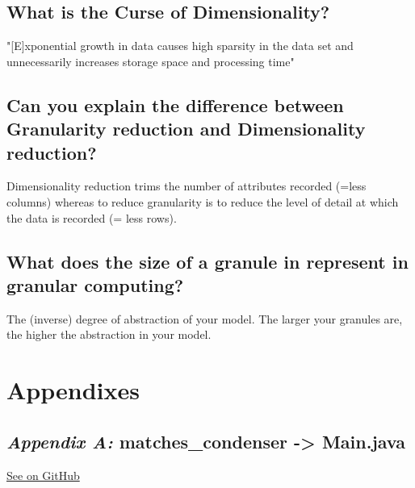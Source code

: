 \subsection{What is the Curse of Dimensionality?}

"[E]xponential growth in data causes high sparsity in the data set and unnecessarily increases storage space and processing time" \cite{poreMustKnowWhatCurse2017}

\subsection{Can you explain the difference between Granularity reduction and Dimensionality reduction?}
Dimensionality reduction trims the number of attributes recorded (=less columns) whereas to reduce granularity is to reduce the level of detail at which the data is recorded (= less rows).

\subsection{What does the size of a granule in represent in granular computing?}
The (inverse) degree of abstraction of your model. The larger your granules are, the higher the abstraction in your model. \cite{yaoGranularComputing2004}




\section*{Appendixes} %

\subsection*{\emph{Appendix A:} matches\_condenser -> Main.java}
\label{subsec:matches-condenser}

\href{https://github.com/marcolussetti/opendotadump-tools/blob/master/matches_condenser/src/main/java/com/marcolussetti/opendotamatchescondenser/Main.java}{See on GitHub}

